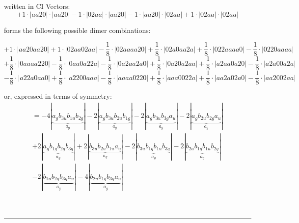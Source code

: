 \documentclass{article}
\begin{document}
\begin{minipage}{\linewidth}
written in CI Vectors: 
 $$+ 1 \cdot \left|aa20 \right| \cdot \left| aa20 \right| 
- 1 \cdot \left|02aa \right| \cdot \left| aa20 \right| 
- 1 \cdot \left|aa20 \right| \cdot \left| 02aa \right| 
+ 1 \cdot \left|02aa \right| \cdot \left| 02aa \right| 
$$



 forms the following possible dimer combinations:

$$+ 1 \cdot \left|aa20aa20 \right| + 1 \cdot \left|02aa02aa \right| - \frac{1}{8} \cdot \left|02aaaa20 \right| + \frac{1}{8} \cdot \left|02a0aa2a \right| + \frac{1}{8} \cdot \left|022aaaa0 \right| - \frac{1}{8} \cdot \left|0220aaaa \right|  $$ $$ + \frac{1}{8} \cdot \left|0aaaa220 \right| - \frac{1}{8} \cdot \left|0aa0a22a \right| - \frac{1}{8} \cdot \left|0a2aa2a0 \right| + \frac{1}{8} \cdot \left|0a20a2aa \right| + \frac{1}{8} \cdot \left|a2aa0a20 \right| - \frac{1}{8} \cdot \left|a2a00a2a \right|  $$ $$ - \frac{1}{8} \cdot \left|a22a0aa0 \right| + \frac{1}{8} \cdot \left|a2200aaa \right| - \frac{1}{8} \cdot \left|aaaa0220 \right| + \frac{1}{8} \cdot \left|aaa0022a \right| + \frac{1}{8} \cdot \left|aa2a02a0 \right| - \frac{1}{8} \cdot \left|aa2002aa \right| $$



\end{minipage}
\vspace{0.5cm}


or, expressed in terms of symmetry:\begin{multline*}
=-4\left|\underbrace{a_{g} b_{3u} b_{1u} b_{2g}}_{a_{g}}\right|-2\left|\underbrace{a_{g} b_{3u} b_{2u} b_{1g}}_{a_{g}}\right|-2\left|\underbrace{a_{g} b_{3u} b_{3g} a_{u}}_{a_{g}}\right|-2\left|\underbrace{a_{g} b_{2u} b_{2g} a_{u}}_{a_{g}}\right|\\
+2\left|\underbrace{a_{g} b_{1g} b_{2g} b_{3g}}_{a_{g}}\right|+2\left|\underbrace{b_{3u} b_{2u} b_{1u} a_{u}}_{a_{g}}\right|-2\left|\underbrace{b_{3u} b_{1g} b_{1u} b_{3g}}_{a_{g}}\right|-2\left|\underbrace{b_{2u} b_{1g} b_{1u} b_{2g}}_{a_{g}}\right|\\
-2\left|\underbrace{b_{1u} b_{2g} b_{3g} a_{u}}_{a_{g}}\right|-4\left|\underbrace{b_{2u} b_{1g} b_{3g} a_{u}}_{a_{g}}\right|
\end{multline*}\\\\

 


\hrule
\vspace{0.5cm}
\end{document}
